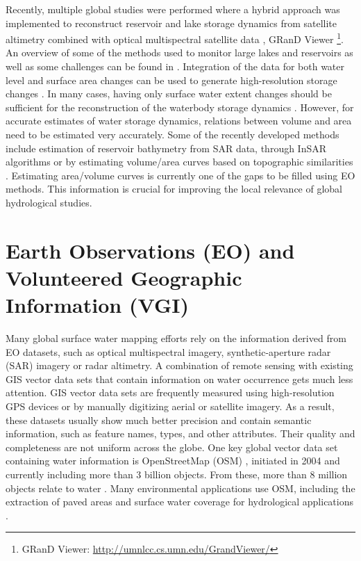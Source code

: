 Recently, multiple global studies were performed where a hybrid approach was implemented to reconstruct reservoir and lake storage dynamics from satellite altimetry combined with optical multispectral satellite data \citep{khandelwal2016approach}, GRanD Viewer \footnote{GRanD Viewer: \url{http://umnlcc.cs.umn.edu/GrandViewer/}}. An overview of some of the methods used to monitor large lakes and reservoirs as well as some challenges can be found in \citep{karpatne2016global}. Integration of the data for both water level and surface area changes can be used to generate high-resolution storage changes \cite{duan2013estimating}. In many cases, having only surface water extent changes should be sufficient for the reconstruction of the waterbody storage dynamics \citep{liebe2005estimation}. However, for accurate estimates of water storage dynamics, relations between volume and area need to be estimated very accurately.  Some of the recently developed methods include estimation of reservoir bathymetry from SAR data, through InSAR algorithms \citep{amitrano2014sentinel} or by estimating volume/area curves based on topographic similarities \citep{bemmelen2016determining}. Estimating area/volume curves is currently one of the gaps to be filled using EO methods. This information is crucial for improving the local relevance of global hydrological studies. 

\section{Earth Observations (EO) and Volunteered Geographic Information (VGI)}
Many global surface water mapping efforts rely on the information derived from EO datasets, such as optical multispectral imagery, synthetic-aperture radar (SAR) imagery or radar altimetry. A combination of remote sensing with existing GIS vector data sets that contain information on water occurrence gets much less attention. GIS vector data sets are frequently measured using high-resolution GPS devices or by manually digitizing aerial or satellite imagery. As a result, these datasets usually show much better precision and contain semantic information, such as feature names, types, and other attributes. Their quality and completeness are not uniform across the globe. One key global vector data set containing water information is OpenStreetMap (OSM) \citep{Haklay2010}, initiated in 2004 and currently including more than 3 billion objects. From these, more than 8 million objects relate to water \citep{webOSMTagInfo}. Many environmental applications use OSM, including the extraction of paved areas and surface water coverage for hydrological applications \citep{Schellekens2014}. 

